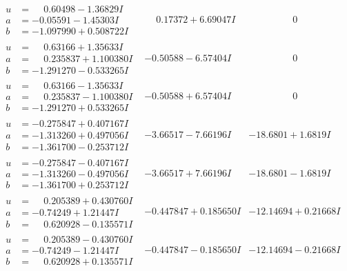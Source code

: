 \documentclass[1p]{elsarticle_modified}
\theoremstyle{definition}
\begin{document}
$$\begin{array}{c|c|c}
\begin{aligned}
u &= \phantom{-}0.60498 - 1.36829 I \\
a &= -0.05591 - 1.45303 I \\
b &= -1.097990 + 0.508722 I\end{aligned}
 & \phantom{-}0.17372 + 6.69047 I & \phantom{-0.000000 } 0 \\ \hline\begin{aligned}
u &= \phantom{-}0.63166 + 1.35633 I \\
a &= \phantom{-}0.235837 + 1.100380 I \\
b &= -1.291270 - 0.533265 I\end{aligned}
 & -0.50588 - 6.57404 I & \phantom{-0.000000 } 0 \\ \hline\begin{aligned}
u &= \phantom{-}0.63166 - 1.35633 I \\
a &= \phantom{-}0.235837 - 1.100380 I \\
b &= -1.291270 + 0.533265 I\end{aligned}
 & -0.50588 + 6.57404 I & \phantom{-0.000000 } 0 \\ \hline\begin{aligned}
u &= -0.275847 + 0.407167 I \\
a &= -1.313260 + 0.497056 I \\
b &= -1.361700 - 0.253712 I\end{aligned}
 & -3.66517 - 7.66196 I & -18.6801 + 1.6819 I \\ \hline\begin{aligned}
u &= -0.275847 - 0.407167 I \\
a &= -1.313260 - 0.497056 I \\
b &= -1.361700 + 0.253712 I\end{aligned}
 & -3.66517 + 7.66196 I & -18.6801 - 1.6819 I \\ \hline\begin{aligned}
u &= \phantom{-}0.205389 + 0.430760 I \\
a &= -0.74249 + 1.21447 I \\
b &= \phantom{-}0.620928 - 0.135571 I\end{aligned}
 & -0.447847 + 0.185650 I & -12.14694 + 0.21668 I \\ \hline\begin{aligned}
u &= \phantom{-}0.205389 - 0.430760 I \\
a &= -0.74249 - 1.21447 I \\
b &= \phantom{-}0.620928 + 0.135571 I\end{aligned}
 & -0.447847 - 0.185650 I & -12.14694 - 0.21668 I\\

\end{array}$$
\end{document}
